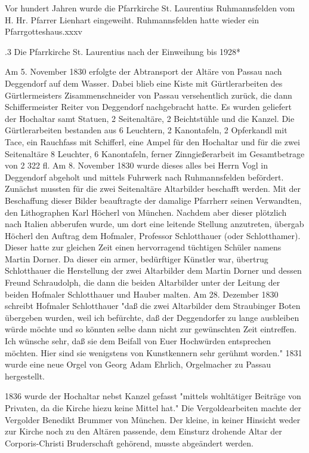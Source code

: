 \documentclass{book}
\begin{document}
Vor hundert Jahren wurde die Pfarrkirche St. Laurentius Ruhmannsfelden vom H.
Hr. Pfarrer Lienhart eingeweiht. Ruhmannsfelden hatte wieder ein
Pfarrgotteshaus.xxxv

.3 Die Pfarrkirche St. Laurentius nach der Einweihung bis 1928*

Am 5. November 1830 erfolgte der Abtransport der Altäre von Passau nach
Deggendorf auf dem Wasser. Dabei blieb eine Kiste mit Gürtlerarbeiten des
Gürtlermeisters Zisammenschneider von Passau versehentlich zurück, die dann
Schiffermeister Reiter von Deggendorf nachgebracht hatte. Es wurden geliefert
der Hochaltar samt Statuen, 2 Seitenaltäre, 2 Beichtstühle und die Kanzel. Die
Gürtlerarbeiten bestanden aus 6 Leuchtern, 2 Kanontafeln, 2 Opferkandl mit Tace,
ein Rauchfass mit Schifferl, eine Ampel für den Hochaltar und für die zwei
Seitenaltäre 8 Leuchter, 6 Kanontafeln, ferner Zinngießerarbeit im Gesamtbetrage
von 2 322 fl. Am 8. November 1830 wurde dieses alles bei Herrn Vogl in
Deggendorf abgeholt und mittels Fuhrwerk nach Ruhmannsfelden befördert. Zunächst
mussten für die zwei Seitenaltäre Altarbilder beschafft werden. Mit der
Beschaffung dieser Bilder beauftragte der damalige Pfarrherr seinen Verwandten,
den Lithographen Karl Höcherl von München. Nachdem aber dieser plötzlich nach
Italien abberufen wurde, um dort eine leitende Stellung anzutreten, übergab
Höcherl den Auftrag dem Hofmaler, Professor Schlotthauer (oder Schlotthamer).
Dieser hatte zur gleichen Zeit einen hervorragend tüchtigen Schüler namens
Martin Dorner. Da dieser ein armer, bedürftiger Künstler war, übertrug
Schlotthauer die Herstellung der zwei Altarbilder dem Martin Dorner und dessen
Freund Schraudolph, die dann die beiden Altarbilder unter der Leitung der beiden
Hofmaler Schlotthauer und Hauber malten. Am 28. Dezember 1830 schreibt Hofmaler
Schlotthauer "daß die zwei Altarbilder dem Straubinger Boten übergeben wurden,
weil ich befürchte, daß der Deggendorfer zu lange ausbleiben würde möchte und so
könnten selbe dann nicht zur gewünschten Zeit eintreffen. Ich wünsche sehr, daß
sie dem Beifall von Euer Hochwürden entsprechen möchten. Hier sind sie
wenigstens von Kunstkennern sehr gerühmt worden." 1831 wurde eine neue Orgel von
Georg Adam Ehrlich, Orgelmacher zu Passau hergestellt.

1836 wurde der Hochaltar nebst Kanzel gefasst "mittels wohltätiger Beiträge von
Privaten, da die Kirche hiezu keine Mittel hat." Die Vergoldearbeiten machte der
Vergolder Benedikt Brummer von München. Der kleine, in keiner Hinsicht weder zur
Kirche noch zu den Altären passende, dem Einsturz drohende Altar der
Corporis-Christi Bruderschaft gehörend, musste abgeändert werden.
\end{document}
